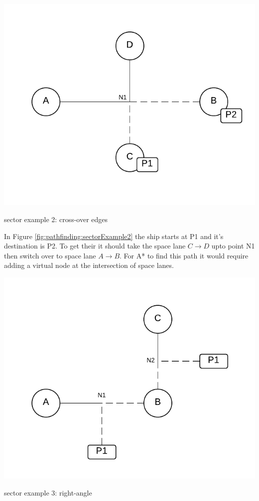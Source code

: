 \begin{marginfigure}
	\includegraphics{res/pathfinding/PathFindingSector2.pdf}
    \caption{sector example 2: cross-over edges}
	\label{fig:pathfinding:sectorExample2}
\end{marginfigure}
In Figure \ref{fig:pathfinding:sectorExample2} the ship starts at P1 and it's destination is P2.
To get their it should take the space lane $C \to D$ upto point N1 then switch over to space lane $A \to B$.
For A* to find this path it would require adding a virtual node at the intersection of space lanes.

\begin{marginfigure}
	\includegraphics{res/pathfinding/PathFindingSector3.pdf}
    \caption{sector example 3: right-angle}
	\label{fig:pathfinding:sectorExample3}
\end{marginfigure}






